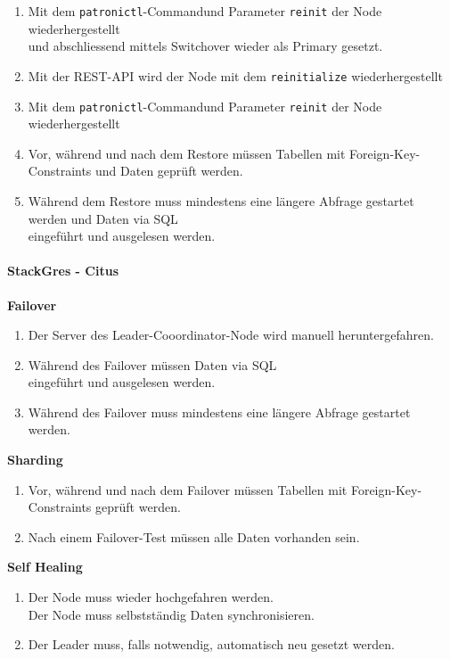 \begin{flushleft}
\begin{description}
\begin{enumerate}[resume]
            \item Mit dem \texttt{patronictl}-Commandund Parameter \texttt{reinit} der Node wiederhergestellt\\und abschliessend mittels Switchover wieder als Primary gesetzt.
            \item Mit der REST-API wird der Node mit dem \texttt{reinitialize} wiederhergestellt
            \item Mit dem \texttt{patronictl}-Commandund Parameter \texttt{reinit} der Node wiederhergestellt
            \item Vor, während und nach dem Restore müssen Tabellen mit Foreign-Key-Constraints und Daten geprüft werden.
            \item Während dem Restore muss mindestens eine längere Abfrage gestartet werden und Daten via SQL\\eingeführt und ausgelesen werden.
        \end{enumerate}
    \end{description}
    \paragraph{StackGres - Citus}
    \begin{description}
        \item \textbf{Failover}\hfill \\
        \begin{enumerate}
            \item Der Server des Leader-Cooordinator-Node wird manuell heruntergefahren.
            \item Während des Failover müssen Daten via SQL\\eingeführt und ausgelesen werden.
            \item Während des Failover muss mindestens eine längere Abfrage gestartet werden.
        \end{enumerate}
        \item \textbf{Sharding}\hfill \\
        \begin{enumerate}[resume]
            \item Vor, während und nach dem Failover müssen Tabellen mit Foreign-Key-Constraints geprüft werden.
            \item Nach einem Failover-Test müssen alle Daten vorhanden sein.
        \end{enumerate}
        \item \textbf{Self Healing}\hfill \\
        \begin{enumerate}[resume]
            \item Der Node muss wieder hochgefahren werden.\\Der Node muss selbstständig Daten synchronisieren.
            \item Der Leader muss, falls notwendig, automatisch neu gesetzt werden.
        \end{enumerate}
    \end{description}

\end{flushleft}
